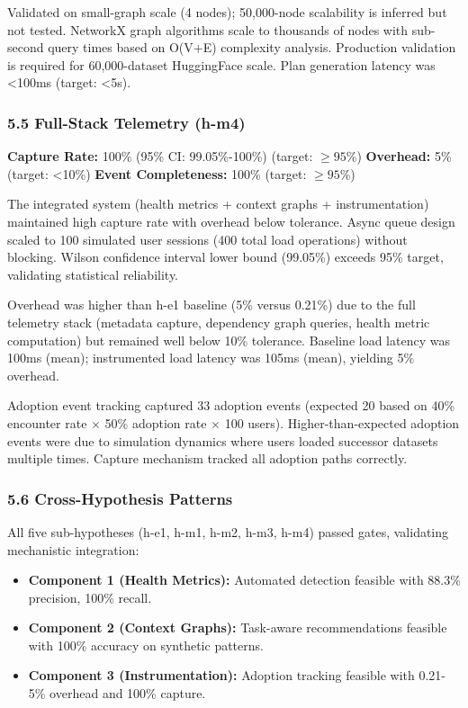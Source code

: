 Validated on small-graph scale (4 nodes); 50,000-node scalability is inferred but not tested. NetworkX graph algorithms scale to thousands of nodes with sub-second query times based on O(V+E) complexity analysis. Production validation is required for 60,000-dataset HuggingFace scale. Plan generation latency was <100ms (target: <5s).

\subsubsection{5.5 Full-Stack Telemetry (h-m4)}

\textbf{Capture Rate:} 100\% (95\% CI: 99.05\%-100\%) (target: $\geq 95$\%)  
\textbf{Overhead:} 5\% (target: <10\%)  
\textbf{Event Completeness:} 100\% (target: $\geq 95$\%)

The integrated system (health metrics + context graphs + instrumentation) maintained high capture rate with overhead below tolerance. Async queue design scaled to 100 simulated user sessions (400 total load operations) without blocking. Wilson confidence interval lower bound (99.05\%) exceeds 95\% target, validating statistical reliability.

Overhead was higher than h-e1 baseline (5\% versus 0.21\%) due to the full telemetry stack (metadata capture, dependency graph queries, health metric computation) but remained well below 10\% tolerance. Baseline load latency was 100ms (mean); instrumented load latency was 105ms (mean), yielding 5\% overhead.

Adoption event tracking captured 33 adoption events (expected 20 based on 40\% encounter rate $\times$ 50\% adoption rate $\times$ 100 users). Higher-than-expected adoption events were due to simulation dynamics where users loaded successor datasets multiple times. Capture mechanism tracked all adoption paths correctly.

\subsubsection{5.6 Cross-Hypothesis Patterns}

All five sub-hypotheses (h-e1, h-m1, h-m2, h-m3, h-m4) passed gates, validating mechanistic integration:

\begin{itemize}
\item \textbf{Component 1 (Health Metrics):} Automated detection feasible with 88.3\% precision, 100\% recall.
\item \textbf{Component 2 (Context Graphs):} Task-aware recommendations feasible with 100\% accuracy on synthetic patterns.
\item \textbf{Component 3 (Instrumentation):} Adoption tracking feasible with 0.21-5\% overhead and 100\% capture.
\end{itemize}

